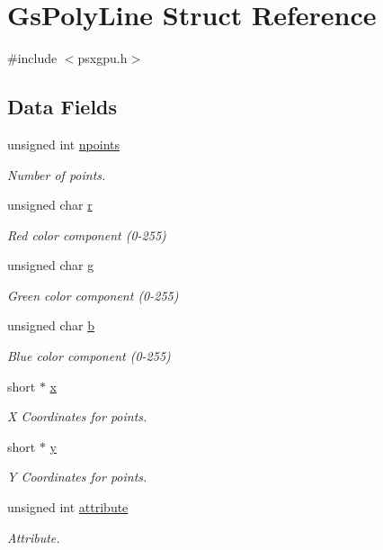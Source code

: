 \hypertarget{structGsPolyLine}{}\section{Gs\+Poly\+Line Struct Reference}
\label{structGsPolyLine}


{\ttfamily \#include $<$psxgpu.\+h$>$}

\subsection*{Data Fields}
\begin{DoxyCompactItemize}
\item 
unsigned int \hyperlink{structGsPolyLine_a48a124ee4e78b6d9043783a9ac17ab32}{npoints}
\begin{DoxyCompactList}\small\item\em Number of points. \end{DoxyCompactList}\item 
unsigned char \hyperlink{structGsPolyLine_a952fee47dff8f921dc3ed3696c11f45f}{r}
\begin{DoxyCompactList}\small\item\em Red color component (0-\/255) \end{DoxyCompactList}\item 
unsigned char \hyperlink{structGsPolyLine_a3d27095afb8a49fac56a51addbb7060a}{g}
\begin{DoxyCompactList}\small\item\em Green color component (0-\/255) \end{DoxyCompactList}\item 
unsigned char \hyperlink{structGsPolyLine_abe1fc08cc228892b44f4a7b6045ff57c}{b}
\begin{DoxyCompactList}\small\item\em Blue color component (0-\/255) \end{DoxyCompactList}\item 
short $\ast$ \hyperlink{structGsPolyLine_a59e6713f08107aab17305c134e8125d8}{x}
\begin{DoxyCompactList}\small\item\em X Coordinates for points. \end{DoxyCompactList}\item 
short $\ast$ \hyperlink{structGsPolyLine_a994b4bf37b4107426d1edaccd58997cd}{y}
\begin{DoxyCompactList}\small\item\em Y Coordinates for points. \end{DoxyCompactList}\item 
unsigned int \hyperlink{structGsPolyLine_af58d38050162099d09ee1f72b228af19}{attribute}
\begin{DoxyCompactList}\small\item\em Attribute. \end{DoxyCompactList}\end{DoxyCompactItemize}


